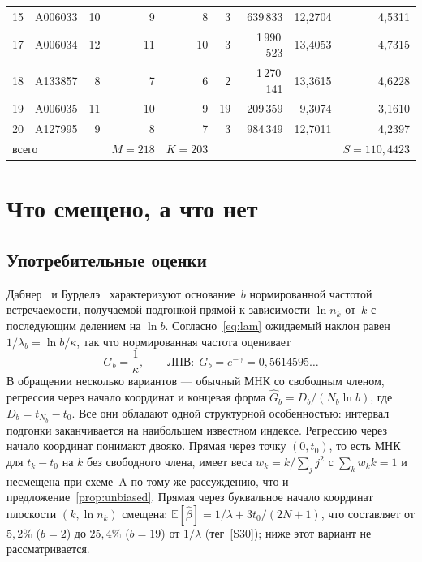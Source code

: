\documentclass[11pt,a4paper]{article}
\theoremstyle{plain}
\theoremstyle{remark}
\newcommand{\emg}{e^{-\gamma}}
\begin{document}
\begin{table}[t]
\begin{tabular}{rlrrrrrrr}
15 & A006033 & 10 & 9 & 8 & 3 & 639\,833 & 12{,}2704 & 4{,}5311\\
17 & A006034 & 12 & 11 & 10 & 3 & 1\,990\,523 & 13{,}4053 & 4{,}7315\\
18 & A133857 & 8 & 7 & 6 & 2 & 1\,270\,141 & 13{,}3615 & 4{,}6228\\
19 & A006035 & 11 & 10 & 9 & 19 & 209\,359 & 9{,}3074 & 3{,}1610\\
20 & A127995 & 9 & 8 & 7 & 3 & 984\,349 & 12{,}7011 & 4{,}2397\\
\midrule
\multicolumn{3}{l}{всего} & $M=218$ & $K=203$ & & & & $S=110{,}4423$\\
\bottomrule
\end{tabular}
\end{table}

\section{Что смещено, а что нет}\label{sec:notbias}

\subsection{Употребительные оценки}
Дабнер~\cite{dubner1993} и Бурделэ~\cite{bourdelais2009} характеризуют основание~$b$
нормированной частотой встречаемости, получаемой подгонкой прямой к зависимости
$\ln n_k$ от~$k$ с последующим делением на $\ln b$. Согласно~\eqref{eq:lam} ожидаемый
наклон равен $1/\lambda_b=\ln b/\kappa$, так что нормированная частота оценивает
\begin{equation}\label{eq:G}
G_b=\frac{1}{\kappa},\qquad\text{ЛПВ:}\ \ G_b=\emg=0{,}5614595\ldots
\end{equation}
В обращении несколько вариантов --- обычный МНК со свободным членом, регрессия через
начало координат и концевая форма $\hat G_b=D_b/(N_b\ln b)$, где $D_b=t_{N_b}-t_0$.
Все они обладают одной структурной особенностью: интервал подгонки заканчивается на наибольшем
известном индексе. Регрессию через начало координат понимают двояко. Прямая через
точку $(0,t_0)$, то есть МНК для $t_k-t_0$ на $k$ без свободного члена, имеет веса
$w_k=k/\sum_jj^2$ с $\sum_kw_kk=1$ и несмещена при схеме~A по тому же рассуждению,
что и предложение~\ref{prop:unbiased}. Прямая через буквальное начало координат
плоскости $(k,\ln n_k)$ смещена: $\mathbb E[\hat\beta]=1/\lambda+3t_0/(2N+1)$, что
составляет от $5{,}2\%$ ($b=2$) до $25{,}4\%$ ($b=19$) от $1/\lambda$ (тег~[S30]);
ниже этот вариант не рассматривается.
\end{document}
